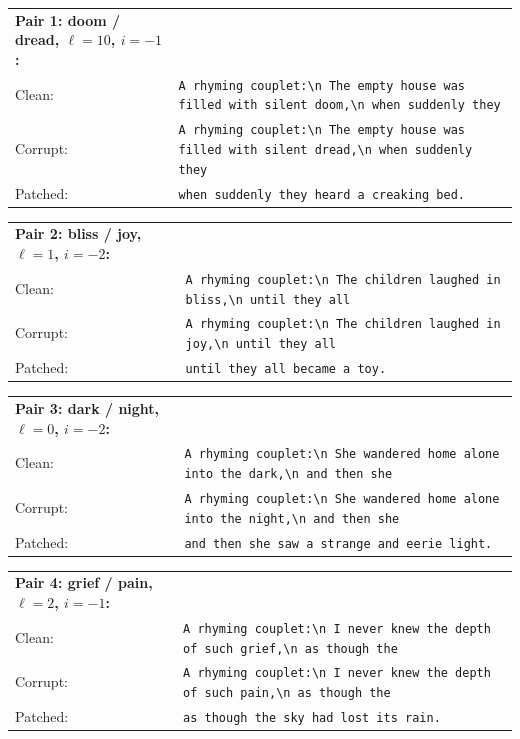 \documentclass{article}
\begin{document}
\begin{tabularx}{\linewidth}{@{}l>{\raggedright\arraybackslash}X@{}}
\textbf{Pair 1: doom / dread, $\ell=10$, $i=-1$:} & \\
Clean:   & \texttt{A rhyming couplet:\textbackslash n The empty house was filled with silent doom,\textbackslash n when suddenly they} \\
Corrupt: & \texttt{A rhyming couplet:\textbackslash n The empty house was filled with silent dread,\textbackslash n when suddenly they} \\
Patched: & \texttt{when suddenly they heard a creaking bed.}
\end{tabularx}

\medskip
\begin{tabularx}{\linewidth}{@{}l>{\raggedright\arraybackslash}X@{}}
\textbf{Pair 2: bliss / joy, $\ell=1$, $i=-2$:} & \\
Clean:   & \texttt{A rhyming couplet:\textbackslash n The children laughed in bliss,\textbackslash n until they all} \\
Corrupt: & \texttt{A rhyming couplet:\textbackslash n The children laughed in joy,\textbackslash n until they all} \\
Patched: & \texttt{until they all became a toy.}
\end{tabularx}

\medskip
\begin{tabularx}{\linewidth}{@{}l>{\raggedright\arraybackslash}X@{}}
\textbf{Pair 3: dark / night, $\ell=0$, $i=-2$:} & \\
Clean:   & \texttt{A rhyming couplet:\textbackslash n She wandered home alone into the dark,\textbackslash n and then she} \\
Corrupt: & \texttt{A rhyming couplet:\textbackslash n She wandered home alone into the night,\textbackslash n and then she} \\
Patched: & \texttt{and then she saw a strange and eerie light.}
\end{tabularx}

\medskip
\begin{tabularx}{\linewidth}{@{}l>{\raggedright\arraybackslash}X@{}}
\textbf{Pair 4: grief / pain, $\ell=2$, $i=-1$:} & \\
Clean:   & \texttt{A rhyming couplet:\textbackslash n I never knew the depth of such grief,\textbackslash n as though the} \\
Corrupt: & \texttt{A rhyming couplet:\textbackslash n I never knew the depth of such pain,\textbackslash n as though the} \\
Patched: & \texttt{as though the sky had lost its rain.}
\end{tabularx}
\end{document}
